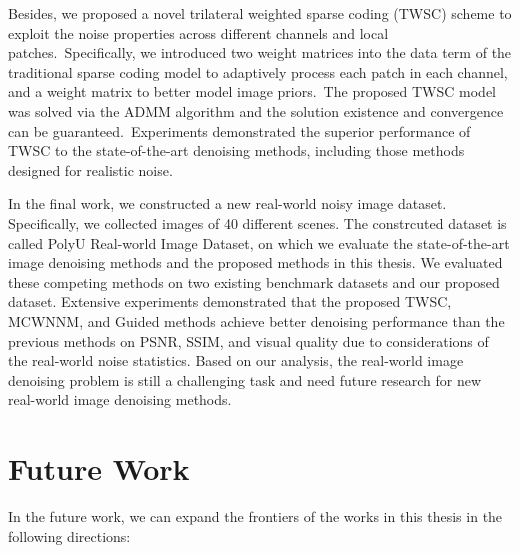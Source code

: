 Besides, we proposed a novel trilateral weighted sparse coding (TWSC) scheme to exploit the noise properties across different channels and local patches.\ Specifically, we introduced two weight matrices into the data term of the traditional sparse coding model to adaptively process each patch in each channel, and a weight matrix to better model image priors.\ The proposed TWSC model was solved via the ADMM algorithm and the solution existence and convergence can be guaranteed.\ Experiments demonstrated the superior performance of TWSC to the state-of-the-art denoising methods, including those methods designed for realistic noise.

In the final work, we constructed a new real-world noisy image dataset. Specifically, we collected images of 40 different scenes. The constrcuted dataset is called PolyU Real-world Image Dataset, on which we evaluate the state-of-the-art image denoising methods and the proposed methods in this thesis. We evaluated these competing methods on two existing benchmark datasets and our proposed dataset. Extensive experiments demonstrated that the proposed TWSC, MCWNNM, and Guided methods achieve better denoising performance than the previous methods on PSNR, SSIM, and visual quality due to considerations of the real-world noise statistics. Based on our analysis, the real-world image denoising problem is still a challenging task and need future research for new real-world image denoising methods.

\section{Future Work}
\label{sec:conclusions:future}

In the future work, we can expand the frontiers of the works in this thesis in the following directions:

